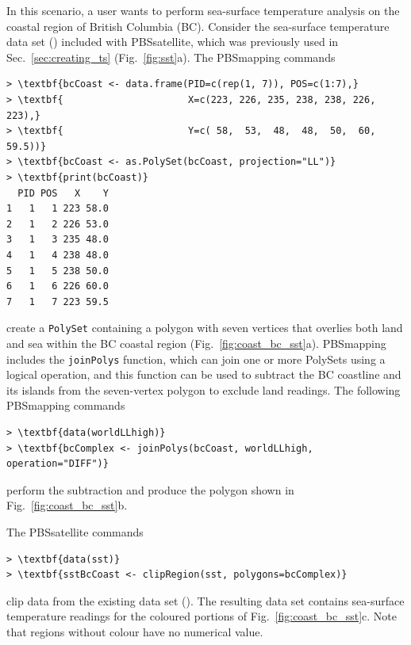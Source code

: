 \documentclass[11pt]{report}
\begin{document}
In this scenario, a user wants to perform sea-surface temperature analysis on the coastal region of British Columbia (BC).
Consider the sea-surface temperature data set () included with PBSsatellite, which was previously used in Sec.~\ref{sec:creating_ts} (Fig.~\ref{fig:sst}a).
The PBSmapping commands
\begin{Verbatim}[xleftmargin=.5in,commandchars=\\\{\},samepage=true]
> \textbf{bcCoast <- data.frame(PID=c(rep(1, 7)), POS=c(1:7),}
> \textbf{                      X=c(223, 226, 235, 238, 238, 226, 223),}
> \textbf{                      Y=c( 58,  53,  48,  48,  50,  60, 59.5))}
> \textbf{bcCoast <- as.PolySet(bcCoast, projection="LL")}
> \textbf{print(bcCoast)}
  PID POS   X    Y
1   1   1 223 58.0
2   1   2 226 53.0
3   1   3 235 48.0
4   1   4 238 48.0
5   1   5 238 50.0
6   1   6 226 60.0
7   1   7 223 59.5
\end{Verbatim}
create a \lstinline{PolySet} containing a polygon with seven vertices that overlies both land and sea within the BC coastal region (Fig.~\ref{fig:coast_bc_sst}a).
PBSmapping includes the \texttt{joinPolys} function, which can join one or more PolySets using a logical operation, and this function can be used to subtract the BC coastline and its islands from the seven-vertex polygon to exclude land readings.
The following PBSmapping commands
\begin{Verbatim}[xleftmargin=.5in,commandchars=\\\{\},samepage=true]
> \textbf{data(worldLLhigh)}
> \textbf{bcComplex <- joinPolys(bcCoast, worldLLhigh, operation="DIFF")}
\end{Verbatim}
perform the subtraction and produce the polygon shown in Fig.~\ref{fig:coast_bc_sst}b.

The PBSsatellite commands
\begin{Verbatim}[xleftmargin=.5in,commandchars=\\\{\},samepage=true]
> \textbf{data(sst)}
> \textbf{sstBcCoast <- clipRegion(sst, polygons=bcComplex)}
\end{Verbatim}
clip data from the existing data set ().
The resulting data set contains sea-surface temperature readings for the coloured portions of Fig.~\ref{fig:coast_bc_sst}c.
Note that regions without colour have no numerical value.
\end{document}
